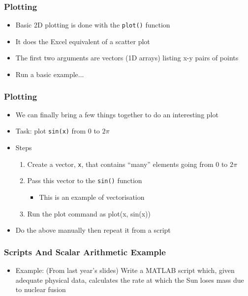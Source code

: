 \documentclass[14pt]{beamer}
\begin{document}
\begin{frame}
\frametitle{Plotting}
\begin{itemize}
\item Basic 2D plotting is done with the \texttt{plot()} function
\item It does the Excel equivalent of a scatter plot
\item The first two arguments are vectors (1D arrays) listing x-y pairs of points
\item Run a basic example...
\end{itemize}
\end{frame}

\begin{frame}
\frametitle{Plotting}
\begin{itemize}
\item We can finally bring a few things together to do an interesting plot
\pause
\item Task: plot \texttt{sin(x)} from $0$ to $2\pi$
\item Steps
	\begin{enumerate}
		\item Create a vector, \texttt{x}, that contains ``many'' elements going from $0$ to $2\pi$
		\item Pass this vector to the \texttt{sin()} function
			\begin{itemize}
				\item This is an example of vectorisation
			\end{itemize}
		\item Run the plot command as plot(x, sin(x))
	\end{enumerate}
\item Do the above manually then repeat it from a script
\end{itemize}
\end{frame}

\begin{frame}
\frametitle{Scripts And Scalar Arithmetic Example}
\begin{itemize}
\item Example: (From last year's slides) Write a MATLAB script which, given adequate physical data, calculates the rate at which the Sun loses mass due to nuclear fusion 
\end{itemize}
\end{frame}
\end{document}
